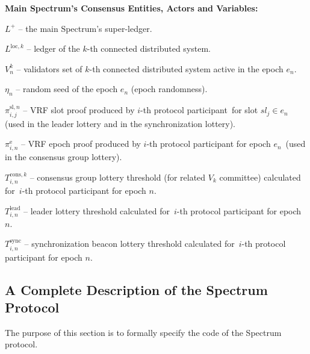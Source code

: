 \noindent
\textbf{Main Spectrum's Consensus Entities, Actors and Variables:}
\begin{legal}
    \item[\ding{113}] $L^+$ -- the main Spectrum's super-ledger.
    \item[\ding{113}] $L^{\text{loc}, k}$ -- ledger of the $k$-th connected distributed system.
    \item[\ding{113}] $V^k_n$ -- validators set of $k$-th connected distributed system active in the epoch $e_n$.
    \item[\ding{113}] $\eta_n$ -- random seed of the epoch $e_n$ (epoch randomness).
    \item[\ding{113}] $\pi^{\text{sl}, n}_{i, j}$ -- VRF slot proof produced by $i$-th protocol participant\
    for slot $sl_j \in e_n$ (used in the leader lottery and in the synchronization lottery).
    \item[\ding{113}] $\pi^{\text{e}}_{i, n}$ -- VRF epoch proof produced by $i$-th protocol participant for epoch $e_n$\
    (used in the consensus group lottery).
    \item[\ding{113}] $T^{\text{cons}, k}_{i, n}$ -- consensus group lottery threshold (for related $V_k$ committee) calculated for\
    $i$-th protocol participant for epoch $n$.
    \item[\ding{113}] $T^{\text{lead}}_{i, n}$ -- leader lottery threshold calculated for\
    $i$-th protocol participant for epoch $n$.
    \item[\ding{113}] $T^{\text{sync}}_{i, n}$ -- synchronization beacon lottery threshold calculated for\
    $i$-th protocol participant for epoch $n$.
\end{legal}

\newpage

\subsection{A Complete Description of the Spectrum Protocol}\label{subsec:a-complete-description-of-the-spectrum-protocol}
The purpose of this section is to formally specify the code of the Spectrum protocol.

